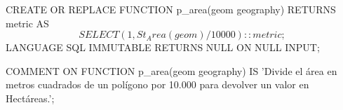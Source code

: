 \begin{SQL}
CREATE OR REPLACE FUNCTION p_area(geom geography)
RETURNS metric AS 
$$

SELECT (1, St_Area(geom)/10000)::metric;

$$
LANGUAGE SQL
IMMUTABLE
RETURNS NULL ON NULL INPUT;

COMMENT ON FUNCTION p_area(geom geography) IS 'Divide el área en metros cuadrados de un polígono por 10.000 para devolver un valor en Hectáreas.';
\end{SQL}
